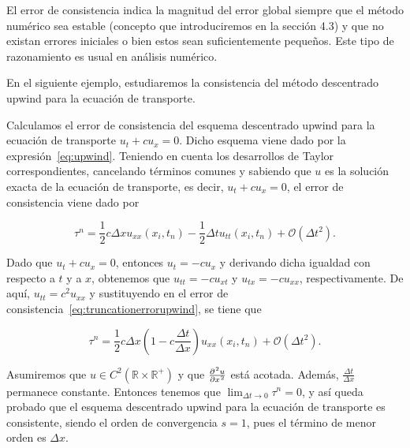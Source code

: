 \begin{remark}
  El error de consistencia indica la magnitud del error global
  siempre que el método numérico sea estable
  (concepto que introduciremos en la sección 4.3) y que no existan
  errores iniciales o bien estos sean suficientemente pequeños.
  Este tipo de razonamiento es usual en análisis numérico.
\end{remark}

En el siguiente ejemplo, estudiaremos la consistencia del método
descentrado upwind para la ecuación de transporte.

\begin{example}
  Calculamos el error de consistencia del esquema descentrado upwind
  para la ecuación de transporte
  \begin{math}
    u_{t}+
    cu_{x}=
    0.
  \end{math}
  Dicho esquema viene dado por la expresión~\eqref{eq:upwind}.
  Teniendo en cuenta los desarrollos de Taylor correspondientes,
  cancelando términos comunes y sabiendo que $u$ es la solución
  exacta de la ecuación de transporte, es decir,
  $u_{t}+cu_{x}=0$, el error de consistencia viene dado por

  \begin{equation}\label{eq:truncationerrorupwind}
    \tau^{n}=
    \frac{1}{2}
    c\Delta x
    u_{xx}
    \left(x_{i},t_{n}\right)-
    \frac{1}{2}\Delta t
    u_{tt}
    \left(x_{i},t_{n}\right)+
    \mathcal{O}
    \left(\Delta t^{2}\right).
  \end{equation}

  Dado que $u_{t}+cu_{x}=0$, entonces $u_{t}=-cu_{x}$ y derivando
  dicha igualdad con respecto a $t$ y a $x$, obtenemos que
  $u_{tt}=-cu_{xt}$ y $u_{tx}=-cu_{xx}$, respectivamente.
  De aquí, $u_{tt}=c^{2}u_{xx}$ y sustituyendo en el error de
  consistencia~\eqref{eq:truncationerrorupwind}, se tiene que

  \begin{equation*}
    \tau^{n}=
    \frac{1}{2}
    c\Delta x
    \left(
    1-c\frac{\Delta t}{\Delta x}
    \right)
    u_{xx}
    \left(x_{i},t_{n}\right)+
    \mathcal{O}
    \left(\Delta t^{2}\right).
  \end{equation*}

  Asumiremos que
  \begin{math}
    u\in
    C^{2}
    \left(
    \mathbb{R}\times
    \mathbb{R}^{+}
    \right)
  \end{math}
  y que $\diffp[2]{u}{x}$ está acotada.
  Además, $\frac{\Delta t}{\Delta x}$ permanece constante.
  Entonces tenemos que $\lim_{\Delta t\to0}\tau^{n}=0$, y así queda
  probado que el esquema descentrado upwind para la
  ecuación de transporte es consistente, siendo el orden de
  convergencia $s=1$, pues el término de menor orden es $\Delta x$.
\end{example}

